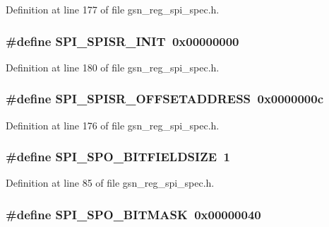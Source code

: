 Definition at line 177 of file gsn\_\-reg\_\-spi\_\-spec.h.

\hypertarget{a00573_ac61b96b3b08a4cd275553b624848060c}{
\subsubsection[{SPI\_\-SPISR\_\-INIT}]{\setlength{\rightskip}{0pt plus 5cm}\#define SPI\_\-SPISR\_\-INIT~0x00000000}}
\label{a00573_ac61b96b3b08a4cd275553b624848060c}


Definition at line 180 of file gsn\_\-reg\_\-spi\_\-spec.h.

\hypertarget{a00573_a949508ccf8388d5540658d6b515997fd}{
\subsubsection[{SPI\_\-SPISR\_\-OFFSETADDRESS}]{\setlength{\rightskip}{0pt plus 5cm}\#define SPI\_\-SPISR\_\-OFFSETADDRESS~0x0000000c}}
\label{a00573_a949508ccf8388d5540658d6b515997fd}


Definition at line 176 of file gsn\_\-reg\_\-spi\_\-spec.h.

\hypertarget{a00573_a732f4956a82bd56d8f26559dcef2acff}{
\subsubsection[{SPI\_\-SPO\_\-BITFIELDSIZE}]{\setlength{\rightskip}{0pt plus 5cm}\#define SPI\_\-SPO\_\-BITFIELDSIZE~1}}
\label{a00573_a732f4956a82bd56d8f26559dcef2acff}


Definition at line 85 of file gsn\_\-reg\_\-spi\_\-spec.h.

\hypertarget{a00573_a22d30b2da982bb491cee8354bc7ac302}{
\subsubsection[{SPI\_\-SPO\_\-BITMASK}]{\setlength{\rightskip}{0pt plus 5cm}\#define SPI\_\-SPO\_\-BITMASK~0x00000040}}
\label{a00573_a22d30b2da982bb491cee8354bc7ac302}


